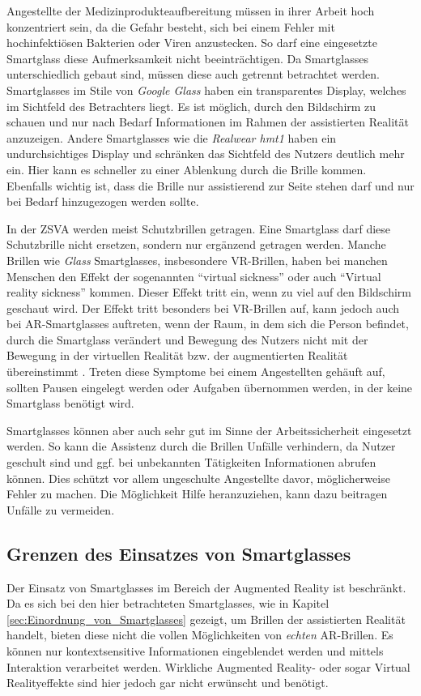Angestellte der Medizinprodukteaufbereitung müssen in ihrer Arbeit hoch konzentriert sein, da die Gefahr besteht, sich bei einem Fehler mit hochinfektiösen Bakterien oder Viren anzustecken. So darf eine eingesetzte Smartglass diese Aufmerksamkeit nicht beeinträchtigen. Da Smartglasses unterschiedlich gebaut sind, müssen diese auch getrennt betrachtet werden. Smartglasses im Stile von \emph{Google Glass} haben ein transparentes Display, welches im Sichtfeld des Betrachters liegt. Es ist möglich, durch den Bildschirm zu schauen und nur nach Bedarf Informationen im Rahmen der assistierten Realität anzuzeigen. Andere Smartglasses wie die \emph{Realwear hmt1} haben ein undurchsichtiges Display und schränken das Sichtfeld des Nutzers deutlich mehr ein. Hier kann es schneller zu einer Ablenkung durch die Brille kommen. Ebenfalls wichtig ist, dass die Brille nur assistierend zur Seite stehen darf und nur bei Bedarf hinzugezogen werden sollte.

In der ZSVA werden meist Schutzbrillen getragen. Eine Smartglass darf diese Schutzbrille nicht ersetzen, sondern nur ergänzend getragen werden. Manche Brillen wie \emph{Glass} Smartglasses, insbesondere VR-Brillen, haben bei manchen Menschen den Effekt der sogenannten \enquote{virtual sickness} oder auch \enquote{Virtual reality sickness} kommen. Dieser Effekt tritt ein, wenn zu viel auf den Bildschirm geschaut wird. Der Effekt tritt besonders bei VR-Brillen auf, kann jedoch auch bei AR-Smartglasses auftreten, wenn der Raum, in dem sich die Person befindet, durch die Smartglass verändert und Bewegung des Nutzers nicht mit der Bewegung in der virtuellen Realität bzw. der augmentierten Realität übereinstimmt \cite{Moss2011}. Treten diese Symptome bei einem Angestellten gehäuft auf, sollten Pausen eingelegt werden oder Aufgaben übernommen werden, in der keine Smartglass benötigt wird.

Smartglasses können aber auch sehr gut im Sinne der Arbeitssicherheit eingesetzt werden. So kann die Assistenz durch die Brillen Unfälle verhindern, da Nutzer geschult sind und ggf. bei unbekannten Tätigkeiten Informationen abrufen können. Dies schützt vor allem ungeschulte Angestellte davor, möglicherweise  Fehler zu machen. Die Möglichkeit Hilfe heranzuziehen, kann dazu beitragen Unfälle zu vermeiden.
%
%
%
%
%
%
\subsection{Grenzen des Einsatzes von Smartglasses}
\label{sec:Grenzen_des_Einsatzes_von_Smartglasses}
Der Einsatz von Smartglasses im Bereich der Augmented Reality ist beschränkt. Da es sich bei den hier betrachteten Smartglasses, wie in Kapitel \ref{sec:Einordnung_von_Smartglasses} gezeigt, um Brillen der assistierten Realität handelt, bieten diese nicht die vollen Möglichkeiten von \emph{echten} AR-Brillen. Es können nur kontextsensitive Informationen eingeblendet werden und mittels Interaktion verarbeitet werden. Wirkliche Augmented Reality- oder sogar Virtual Realityeffekte sind hier jedoch gar nicht erwünscht und benötigt.

